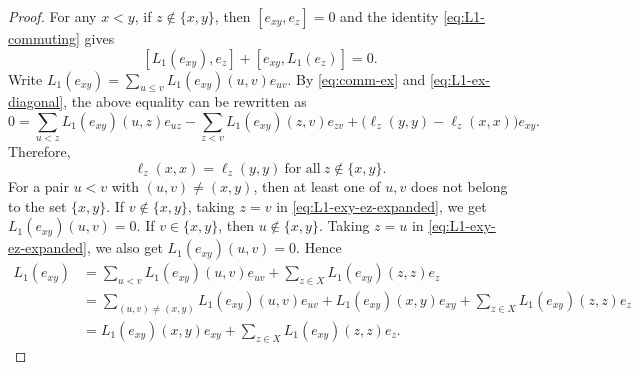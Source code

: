 \documentclass[reqno]{amsart}
\numberwithin{equation}{section}
\theoremstyle{plain}
\theoremstyle{definition}
\begin{document}
\begin{proof}
For any $x<y$, if $z\notin\{x,y\}$, then $[e_{xy},e_z]=0$ and the identity \eqref{eq:L1-commuting} gives
\[
[L_1(e_{xy}),e_z]+[e_{xy},L_1(e_z)]=0.
\]
Write $L_1(e_{xy})=\sum_{u\leq v}L_1(e_{xy})(u,v)e_{uv}$. By \eqref{eq:comm-ex} and \eqref{eq:L1-ex-diagonal},
the above equality can be rewritten as
\begin{equation}\label{eq:L1-exy-ez-expanded}
0=\sum_{u<z}L_1(e_{xy})(u,z)e_{uz}
-\sum_{z<v}L_1(e_{xy})(z,v)e_{zv}+\bigl(\ell_z(y,y)-\ell_z(x,x)\bigr)e_{xy}.
\end{equation}
Therefore,
\begin{equation}\label{eq:gamma-away}
\ell_z(x,x)=\ell_z(y,y)~\text{for~all}~z\notin\{x,y\}.
\end{equation}
For a pair $u<v$ with $(u,v)\neq(x,y)$, then at least one of $u,v$ does not belong to the set $\{x,y\}$.
If $v\notin\{x,y\}$, taking $z=v$ in \eqref{eq:L1-exy-ez-expanded}, we get $L_1(e_{xy})(u,v)=0$.
If $v\in\{x,y\}$, then $u\notin\{x,y\}$. Taking $z=u$ in \eqref{eq:L1-exy-ez-expanded}, we also get $L_1(e_{xy})(u,v)=0$. Hence
\begin{align}
L_1(e_{xy})&=\sum_{u< v}L_1(e_{xy})(u,v)e_{uv}+\sum_{z\in X}L_1(e_{xy})(z,z)e_{z}\nonumber\\
&=\sum_{(u,v)\neq(x,y)}L_1(e_{xy})(u,v)e_{uv}+L_1(e_{xy})(x,y)e_{xy}+\sum_{z\in X}L_1(e_{xy})(z,z)e_{z}\nonumber\\
&=L_1(e_{xy})(x,y)e_{xy}+\sum_{z\in X}L_1(e_{xy})(z,z)e_{z}.\label{eq:L1-exy-preliminary}
\end{align}


\end{proof}
\end{document}
